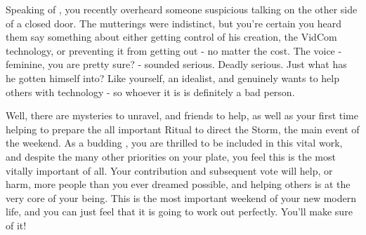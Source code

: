 \documentclass[char]{GL2020}
\begin{document}
Speaking of \cTechStar{}, you recently overheard someone suspicious talking on the other side of a closed door. The mutterings were indistinct, but you’re certain you heard them say something about either getting control of his creation, the VidCom technology, or preventing it from getting out - no matter the cost. The voice - feminine, you are pretty sure? - sounded serious. Deadly serious. Just what has he gotten himself into?  Like yourself, \cTechStar{\they} \cTechStar{\are} an idealist, and genuinely wants to help others with \cTechStar{\their} technology - so whoever it is is definitely a bad person.

Well, there are mysteries to unravel, and friends to help, as well as your first time helping to prepare the all important Ritual to direct the Storm, the main event of the weekend.  As a budding \cDisney{\cleric}, you are thrilled to be included in this vital work, and despite the many other priorities on your plate, you feel this is the most vitally important of all. Your contribution and subsequent vote will help, or harm, more people than you ever dreamed possible, and helping others is at the very core of your being. This is the most important weekend of your new modern life, and you can just feel that it is going to work out perfectly. You’ll make sure of it!








\end{document}
